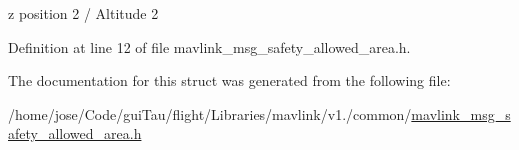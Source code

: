 z position 2 / Altitude 2 



Definition at line 12 of file mavlink\-\_\-msg\-\_\-safety\-\_\-allowed\-\_\-area.\-h.



The documentation for this struct was generated from the following file\-:\begin{DoxyCompactItemize}
\item 
/home/jose/\-Code/gui\-Tau/flight/\-Libraries/mavlink/v1./common/\hyperlink{mavlink__msg__safety__allowed__area_8h}{mavlink\-\_\-msg\-\_\-safety\-\_\-allowed\-\_\-area.\-h}\end{DoxyCompactItemize}
